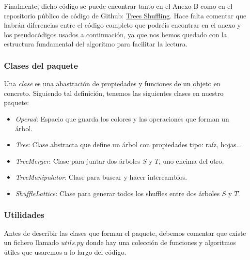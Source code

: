 \documentclass[../main.tex]{subfiles}
\begin{document}
Finalmente, dicho c\'odigo se puede encontrar tanto en el Anexo B como en el repositorio p\'ublico de c\'odigo de Github: \href{https://github.com/rbrasco/trees-shuffling}{Trees Shuffling}.
Hace falta comentar que habr\'an diferencias entre el c\'odigo completo que podr\'eis encontrar en el anexo y los pseudoc\'odigos usados a continuaci\'on, ya que nos hemos quedado con la estructura fundamental del algoritmo para facilitar la lectura.

\subsubsection*{Clases del paquete}
\begin{defi}
    Una \emph{clase} es una abastraci\'on de propiedades y funciones de un objeto en concreto.
    Siguiendo tal definici\'on, tenemos las siguientes clases en nuestro paquete:
    \begin{itemize}
        \item \emph{Operad}: Espacio que guarda los colores y las operaciones que forman un \'arbol.
        \item \emph{Tree}: Clase abstracta que define un \'arbol con propiedades tipo: ra\'iz, hojas$\dots$
        \item \emph{TreeMerger}: Clase para juntar dos \'arboles $S$ y $T$, uno encima del otro.
        \item \emph{TreeManipulator}: Clase para buscar y hacer intercambios.
        \item \emph{ShuffleLattice}: Clase para generar todos los shuffles entre dos \'arboles $S$ y $T$.
    \end{itemize}
\end{defi}

\subsubsection*{Utilidades}
Antes de describir las clases que forman el paquete, debemos comentar que existe un fichero llamado $utils.py$ donde hay una colecci\'on de funciones y algoritmos \'utiles que usaremos a lo largo del c\'odigo.
\end{document}
